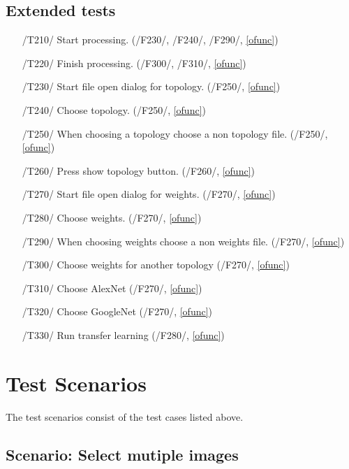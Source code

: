 \documentclass[parskip=full]{scrartcl}
\begin{document}
\pagebreak



\subsection {Extended tests}

\begin{itemize}
	\item[/T210/] Start processing. (/F230/, /F240/, /F290/, \ref{ofunc})
	\item[/T220/] Finish processing. (/F300/, /F310/, \ref{ofunc})
	\item[/T230/] Start file open dialog for topology. (/F250/, \ref{ofunc})
	\item[/T240/] Choose topology. (/F250/, \ref{ofunc})
	\item[/T250/] When choosing a topology choose a non topology file. (/F250/, \ref{ofunc})
	\item[/T260/] Press show topology button. (/F260/, \ref{ofunc})
	\item[/T270/] Start file open dialog for weights. (/F270/, \ref{ofunc})
	\item[/T280/] Choose weights. (/F270/, \ref{ofunc})
	\item[/T290/] When choosing weights choose a non weights file. (/F270/, \ref{ofunc})
	\item[/T300/] Choose weights for another topology (/F270/, \ref{ofunc})
	\item[/T310/] Choose AlexNet (/F270/, \ref{ofunc})
	\item[/T320/] Choose GoogleNet (/F270/, \ref{ofunc})
	\item[/T330/] Run transfer learning (/F280/, \ref{ofunc})
\end{itemize}

\pagebreak





\section{Test Scenarios}

The test scenarios consist of the test cases listed above.

\subsection {Scenario: Select mutiple images}
\end{document}
